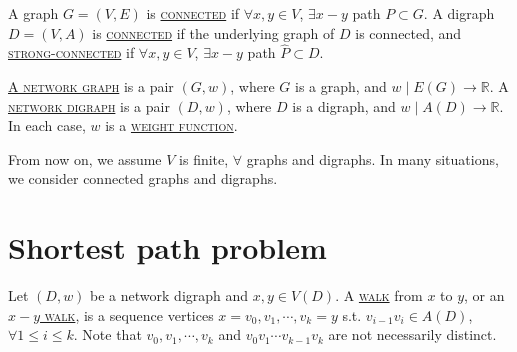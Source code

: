 A graph $G = (V, E)$ is \uline{\textcolor{MarkerColour}{\textsc{connected}}} if $\forall x, y\in V$, $\exists x-y$ path $P\subset G$. A digraph $D = (V, A)$ is \uline{\textcolor{MarkerColour}{\textsc{connected}}} if the underlying graph of $D$ is connected, and \uline{\textcolor{MarkerColour}{\textsc{strong-connected}}} if $\forall x, y\in V$, $\exists x-y$ path $\hat{P}\subset D$.

\uline{\textcolor{MarkerColour}{\textsc{A network graph}}} is a pair $(G, w)$, where $G$ is a graph, and $w\mid E(G)\to\mathbb{R}$. A \uline{\textcolor{MarkerColour}{\textsc{network digraph}}} is a pair $(D, w)$, where $D$ is a digraph, and $w\mid A(D)\to\mathbb{R}$. In each case, $w$ is a \uline{\textcolor{MarkerColour}{\textsc{weight function}}}.

From now on, we assume $V$ is finite, $\forall$ graphs and digraphs. In many situations, we consider connected graphs and digraphs.

\section{Shortest path problem}
\begin{definition}
    Let $(D, w)$ be a network digraph and $x, y\in V(D)$. A \uline{\textcolor{MarkerColour}{\textsc{walk}}} from $x$ to $y$, or an \uline{\textcolor{MarkerColour}{\textsc{$x-y$ walk}}}, is a sequence vertices $x = v_0, v_1, \cdots, v_k = y$ s.t. $v_{i-1}v_i\in A(D)$, $\forall 1\leqslant i\leqslant k$. Note that $v_0, v_1, \cdots, v_k$ and $v_0 v_1 \cdots v_{k-1} v_k$ are not necessarily distinct.
\end{definition}

\vspace{0.5cm}

